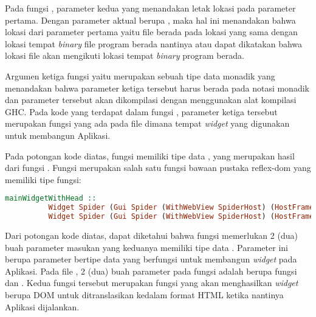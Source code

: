 \documentclass[pi.tex]{subfile}
\begin{document}
    \hspace{5pt}Pada fungsi , parameter kedua yang menandakan letak lokasi pada parameter pertama. Dengan parameter aktual berupa , maka hal ini menandakan bahwa lokasi dari parameter pertama yaitu file  berada pada lokasi yang sama dengan lokasi tempat \emph{binary} file program berada nantinya atau dapat dikatakan bahwa lokasi file  akan mengikuti lokasi tempat \emph{binary} program berada. 

    \hspace{5pt}Argumen ketiga fungsi  yaitu  merupakan sebuah tipe data monadik yang menandakan bahwa parameter ketiga tersebut harus berada pada notasi monadik  dan parameter tersebut akan dikompilasi dengan menggunakan alat kompilasi GHC. Pada kode yang terdapat dalam fungsi , parameter ketiga tersebut merupakan fungsi  yang ada pada file  dimana tempat \emph{widget} yang digunakan untuk membangun Aplikasi.

    \hspace{5pt}Pada potongan kode diatas, fungsi  memiliki tipe data , yang merupakan hasil dari fungsi . Fungsi  merupakan salah satu fungsi bawaan pustaka reflex-dom yang memiliki tipe fungsi:\\
   \begin{lstlisting}[language=Haskell]
      mainWidgetWithHead ::
          Widget Spider (Gui Spider (WithWebView SpiderHost) (HostFrame Spider)) () ->
          Widget Spider (Gui Spider (WithWebView SpiderHost) (HostFrame Spider)) () -> IO ()
   \end{lstlisting}

   \hspace{5pt}Dari potongan kode diatas, dapat diketahui bahwa fungsi  memerlukan 2 (dua) buah parameter masukan yang keduanya memiliki tipe data . Parameter ini berupa parameter bertipe data  yang berfungsi untuk membangun \emph{widget} pada Aplikasi. Pada file , 2 (dua) buah parameter pada fungsi  adalah berupa fungsi  dan . Kedua fungsi tersebut merupakan fungsi yang akan menghasilkan \emph{widget} berupa DOM untuk ditranslasikan kedalam format HTML ketika nantinya Aplikasi dijalankan.
\end{document}
